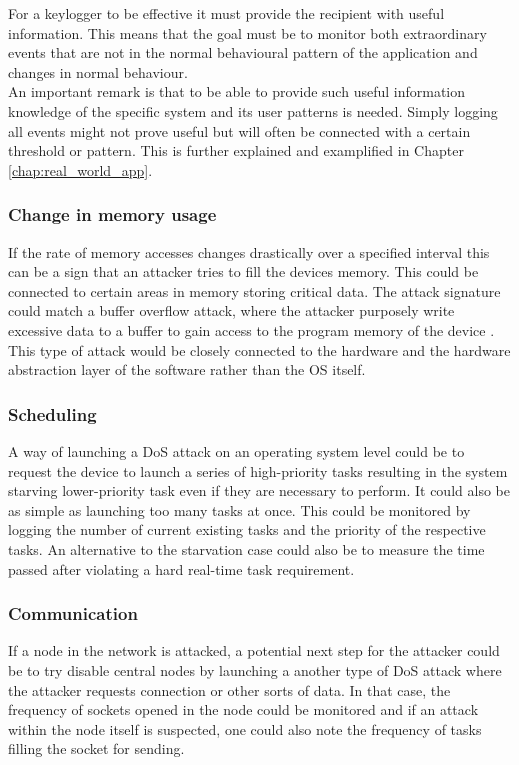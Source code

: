For a keylogger to be effective it must provide the recipient with useful information. This means that the goal must be to monitor both extraordinary events that are not in the normal behavioural pattern of the application and changes in normal behaviour. \\

An important remark is that to be able to provide such useful information knowledge of the specific system and its user patterns is needed. Simply logging all events might not prove useful but will often be connected with a certain threshold or pattern. This is further explained and examplified in Chapter \ref{chap:real_world_app}.  


\subsubsection{Change in memory usage}
If the rate of memory accesses changes drastically over a specified interval this can be a sign that an attacker tries to fill the devices memory. This could be connected to certain areas in memory storing critical data. The attack signature could match a buffer overflow attack, where the attacker purposely write excessive data to a buffer to gain access to the program memory of the device \cite{buffer_overflow}. This type of attack would be closely connected to the hardware and the hardware abstraction layer of the software rather than the OS itself. 

\subsubsection{Scheduling}
A way of launching a DoS attack on an operating system level could be to request the device to launch a series of high-priority tasks resulting in the system starving lower-priority task even if they are necessary to perform. It could also be as simple as launching too many tasks at once. This could be monitored by logging the number of current existing tasks and the priority of the respective tasks. An alternative to the starvation case could also be to measure the time passed after violating a hard real-time task requirement. 

\subsubsection{Communication}
If a node in the network is attacked, a potential next step for the attacker could be to try disable central nodes by launching a another type of DoS attack where the attacker requests connection or other sorts of data. In that case, the frequency of sockets opened in the node could be monitored and if an attack within the node itself is suspected, one could also note the frequency of tasks filling the socket for sending.\\

